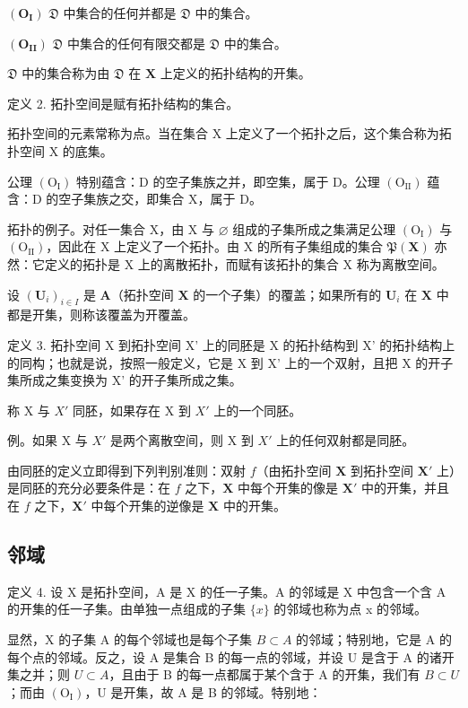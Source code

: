 \((\mathbf{O}_{\mathbf{I}})\) \(\mathfrak{D}\) 中集合的任何并都是 \(\mathfrak{D}\) 中的集合。

\((\mathbf{O}_{\mathbf{II}})\) \(\mathfrak{D}\) 中集合的任何有限交都是 \(\mathfrak{D}\) 中的集合。

\(\mathfrak{D}\) 中的集合称为由 \(\mathfrak{D}\) 在 \(\mathbf{X}\) 上定义的拓扑结构的开集。

定义 2. 拓扑空间是赋有拓扑结构的集合。

拓扑空间的元素常称为点。当在集合 X 上定义了一个拓扑之后，这个集合称为拓扑空间 X 的底集。

公理 \((\mathrm{O}_{\mathrm{I}})\) 特别蕴含：D 的空子集族之并，即空集，属于 D。公理 \((\mathrm{O}_{\mathrm{II}})\) 蕴含：D 的空子集族之交，即集合 X，属于 D。

拓扑的例子。对任一集合 X，由 X 与 \(\varnothing\) 组成的子集所成之集满足公理 \((\mathrm{O}_{\mathrm{I}})\) 与 \((\mathrm{O}_{\mathrm{II}})\)，因此在 X 上定义了一个拓扑。由 X 的所有子集组成的集合 \(\mathfrak{P}(\mathbf{X})\) 亦然：它定义的拓扑是 X 上的离散拓扑，而赋有该拓扑的集合 X 称为离散空间。

设 \((\mathbf{U}_i)_{i\in I}\) 是 \(\mathbf{A}\)（拓扑空间 \(\mathbf{X}\) 的一个子集）的覆盖；如果所有的 \(\mathbf{U}_i\) 在 \(\mathbf{X}\) 中都是开集，则称该覆盖为开覆盖。

定义 3. 拓扑空间 X 到拓扑空间 X' 上的同胚是 X 的拓扑结构到 X' 的拓扑结构上的同构；也就是说，按照一般定义，它是 X 到 X' 上的一个双射，且把 X 的开子集所成之集变换为 X' 的开子集所成之集。

称 X 与 \(X'\) 同胚，如果存在 X 到 \(X'\) 上的一个同胚。

例。如果 X 与 \(X'\) 是两个离散空间，则 X 到 \(X'\) 上的任何双射都是同胚。

由同胚的定义立即得到下列判别准则：双射 \(f\)（由拓扑空间 \(\mathbf{X}\) 到拓扑空间 \(\mathbf{X}'\) 上）是同胚的充分必要条件是：在 \(f\) 之下，\(\mathbf{X}\) 中每个开集的像是 \(\mathbf{X}'\) 中的开集，并且在 \(f\) 之下，\(\mathbf{X}'\) 中每个开集的逆像是 \(\mathbf{X}\) 中的开集。

\subsection{邻域}

定义 4. 设 X 是拓扑空间，A 是 X 的任一子集。A 的邻域是 X 中包含一个含 A 的开集的任一子集。由单独一点组成的子集 \(\{x\}\) 的邻域也称为点 x 的邻域。

显然，X 的子集 A 的每个邻域也是每个子集 \(B \subset A\) 的邻域；特别地，它是 A 的每个点的邻域。反之，设 A 是集合 B 的每一点的邻域，并设 U 是含于 A 的诸开集之并；则 \(U \subset A\)，且由于 B 的每一点都属于某个含于 A 的开集，我们有 \(B \subset U\)；而由 \((\mathrm{O}_{\mathrm{I}})\)，U 是开集，故 A 是 B 的邻域。特别地：

